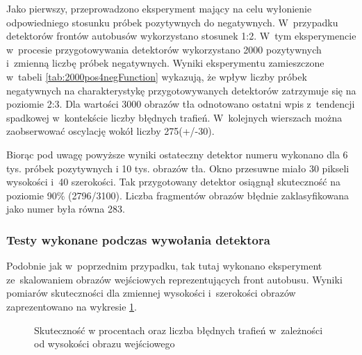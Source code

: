 Jako pierwszy, przeprowadzono eksperyment mający na celu wyłonienie
odpowiedniego stosunku próbek pozytywnych do negatywnych.
W~przypadku detektorów frontów autobusów wykorzystano stosunek 1:2. W~tym eksperymencie w~procesie przygotowywania
detektorów wykorzystano 2000 pozytywnych i~zmienną liczbę próbek
negatywnych.
Wyniki eksperymentu zamieszczone w~tabeli \ref{tab:2000pos4negFunction}
wykazują, że wpływ liczby próbek negatywnych na charakterystykę
przygotowywanych detektorów zatrzymuje się na poziomie 2:3. 
Dla wartości 3000 obrazów tła odnotowano ostatni wpis z~tendencji spadkowej
w~kontekście liczby błędnych trafień. W~kolejnych wierszach
można zaobserwować oscylację wokół liczby 275(+/-30).

Biorąc pod uwagę powyższe wyniki ostateczny detektor numeru wykonano
dla 6 tys. próbek pozytywnych i 10 tys. obrazów tła. Okno przesuwne
miało 30 pikseli wysokości i~40 szerokości. Tak przygotowany
detektor osiągnął skuteczność na poziomie 90\% (2796/3100). Liczba fragmentów
obrazów błędnie zaklasyfikowana jako numer była równa 283.

\subsubsection{Testy wykonane podczas wywołania detektora}

Podobnie jak w~poprzednim przypadku, tak tutaj wykonano eksperyment
ze~skalowaniem obrazów wejściowych reprezentujących front autobusu.
Wyniki pomiarów skuteczności dla zmiennej wysokości i~szerokości
obrazów zaprezentowano na wykresie \ref{chart:front_height2hitratio}.

\begin{figure}[h!]
	\begin{center}
	\end{center}
	\caption{Skuteczność w procentach oraz liczba błędnych trafień 
		w~zależności od wysokości obrazu wejściowego}
	\label{chart:front_height2hitratio}
\end{figure}

